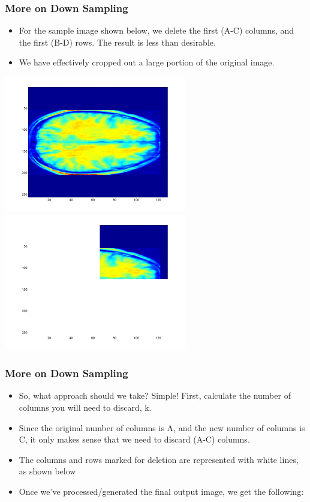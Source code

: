 \documentclass{beamer}
\begin{document}
\begin{frame}
\frametitle{More on Down Sampling}
\begin{itemize}
   \item For the sample image shown below, we delete the first (A-C) columns, and the first (B-D) rows. The result is less than desirable.
   \item We have  effectively cropped out a large portion of the original image.
\end{itemize}
\includegraphics[scale=0.5
]{standard.png}
\includegraphics[scale=0.5
]{cropped.png}
\end{frame}


\begin{frame}
\frametitle{More on Down Sampling}
\begin{itemize}
   \item So, what approach should we take? Simple! First, calculate the number of columns you will need to discard, k. 
   \item Since the original number of columns is A, and the new number of columns is C, it only makes sense that we need to discard (A-C) columns.
   \item The columns and rows marked for deletion are represented with white lines, as shown below
   \item Once we’ve processed/generated the final output image, we get the following:
\end{itemize}
\end{frame}
\end{document}
